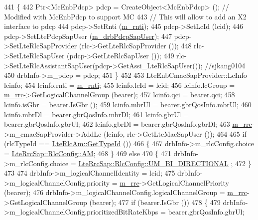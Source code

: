 \begin{DoxyCode}
441     \{
442       Ptr<McEnbPdcp> pdcp = CreateObject<McEnbPdcp> (); \textcolor{comment}{// Modified with McEnbPdcp to support MC}
443                                                         \textcolor{comment}{// This will allow to add an X2 interface to pdcp}
444       pdcp->SetRnti (\hyperlink{classns3_1_1UeManager_a5a72b4fe818f21993bd7f05d7e2c4f83}{m\_rnti});
445       pdcp->SetLcId (lcid);
446       pdcp->SetLtePdcpSapUser (\hyperlink{classns3_1_1UeManager_af261f8dc60848f41e18c9fba89d9903d}{m\_drbPdcpSapUser});
447       pdcp->SetLteRlcSapProvider (rlc->GetLteRlcSapProvider ());
448       rlc->SetLteRlcSapUser (pdcp->GetLteRlcSapUser ());
449       rlc->SetLteRlcAssistantSapUser(pdcp->GetAssi\_LteRlcSapUser()); \textcolor{comment}{//sjkang0104}
450       drbInfo->m\_pdcp = pdcp;
451     \}
452 
453   LteEnbCmacSapProvider::LcInfo lcinfo;
454   lcinfo.rnti = \hyperlink{classns3_1_1UeManager_a5a72b4fe818f21993bd7f05d7e2c4f83}{m\_rnti};
455   lcinfo.lcId = lcid;
456   lcinfo.lcGroup = \hyperlink{classns3_1_1UeManager_ab4405e9f354c66e7c1a4c95832290f5b}{m\_rrc}->GetLogicalChannelGroup (bearer);
457   lcinfo.qci = bearer.qci;
458   lcinfo.isGbr = bearer.IsGbr ();
459   lcinfo.mbrUl = bearer.gbrQosInfo.mbrUl;
460   lcinfo.mbrDl = bearer.gbrQosInfo.mbrDl;
461   lcinfo.gbrUl = bearer.gbrQosInfo.gbrUl;
462   lcinfo.gbrDl = bearer.gbrQosInfo.gbrDl;
463   \hyperlink{classns3_1_1UeManager_ab4405e9f354c66e7c1a4c95832290f5b}{m\_rrc}->m\_cmacSapProvider->AddLc (lcinfo, rlc->GetLteMacSapUser ());
464 
465   \textcolor{keywordflow}{if} (rlcTypeId == \hyperlink{classns3_1_1LteRlcAm_a28143176a465769583d9db0b4b36b91b}{LteRlcAm::GetTypeId} ())
466     \{
467       drbInfo->m\_rlcConfig.choice =  \hyperlink{structns3_1_1LteRrcSap_1_1RlcConfig_ab6ab94ca4abaf717926f31db4dddc61baac722b7609a143367fc24a94f8e4f6c7}{LteRrcSap::RlcConfig::AM};
468     \}
469   \textcolor{keywordflow}{else}
470     \{
471       drbInfo->m\_rlcConfig.choice =  \hyperlink{structns3_1_1LteRrcSap_1_1RlcConfig_ab6ab94ca4abaf717926f31db4dddc61ba55368feac1627138969235809e6eedc5}{LteRrcSap::RlcConfig::UM\_BI\_DIRECTIONAL}
      ;
472     \}
473 
474   drbInfo->m\_logicalChannelIdentity = lcid;
475   drbInfo->m\_logicalChannelConfig.priority =  \hyperlink{classns3_1_1UeManager_ab4405e9f354c66e7c1a4c95832290f5b}{m\_rrc}->GetLogicalChannelPriority (bearer);
476   drbInfo->m\_logicalChannelConfig.logicalChannelGroup = \hyperlink{classns3_1_1UeManager_ab4405e9f354c66e7c1a4c95832290f5b}{m\_rrc}->GetLogicalChannelGroup (bearer);
477   \textcolor{keywordflow}{if} (bearer.IsGbr ())
478     \{
479       drbInfo->m\_logicalChannelConfig.prioritizedBitRateKbps = bearer.gbrQosInfo.gbrUl;

\end{DoxyCode}
